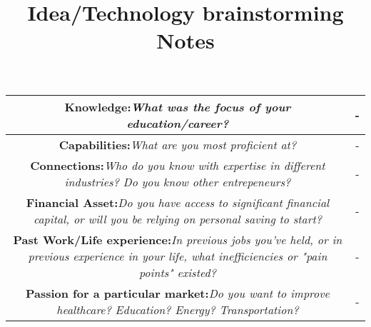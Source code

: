 \documentclass[a3paper, landscape]{article}
\title{Idea/Technology brainstorming Notes}
\begin{document}
\maketitle
\begin{table}[h]
\begin{tabular}{|c|c|}
\hline
\textbf{Knowledge:}\textit{What was the focus of your education/career?}&-\\
\hline
\textbf{Capabilities:}\textit{What are you most proficient at?}&-\\
\hline
\textbf{Connections:}\textit{Who do you know with expertise in different industries? Do you know other entrepeneurs?}&-\\
\hline
\textbf{Financial Asset:}\textit{Do you have access to significant financial capital, or will you be relying on personal saving to start?}&-\\
\hline
\textbf{Past Work/Life experience:}\textit{In previous jobs you've held, or in previous experience in your life, what inefficiencies or "pain points" existed?}&-\\
\hline
\textbf{Passion for a particular market:}\textit{Do you want to improve healthcare? Education? Energy? Transportation?}&-\\
\hline
\end{tabular}
\end{table}
\end{document}
